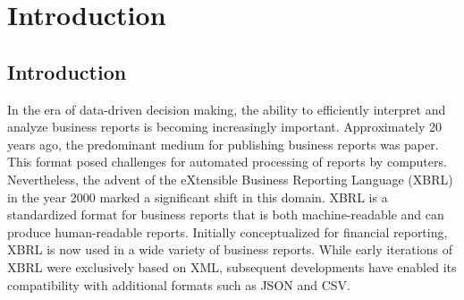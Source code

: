 \chapter{Introduction}
\label{sec:introduction}

\section{Introduction}


In the era of data-driven decision making, the ability to efficiently interpret and analyze business reports is becoming increasingly important.
Approximately 20 years ago,
the predominant medium for publishing business reports was paper.
This format posed challenges for automated processing of reports by computers. 
Nevertheless,
the advent of the eXtensible Business Reporting Language (XBRL) in the year 2000 marked a significant shift in this domain\cite{aicpa_xbrl_story}.
XBRL is a standardized format for business reports that is both machine-readable and can produce human-readable reports.
Initially conceptualized for financial reporting,
XBRL is now used in a wide variety of business reports.\cite{xbrl_about}
While early iterations of XBRL were exclusively based on XML, 
subsequent developments have enabled its compatibility with additional formats such as JSON and CSV.

